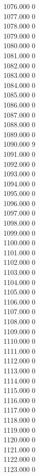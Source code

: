 { 1076.000	0 \\
 1077.000	0 \\
 1078.000	0 \\
 1079.000	0 \\
 1080.000	0 \\
 1081.000	0 \\
 1082.000	0 \\
 1083.000	0 \\
 1084.000	0 \\
 1085.000	0 \\
 1086.000	0 \\
 1087.000	0 \\
 1088.000	0 \\
 1089.000	0 \\
 1090.000	9 \\
 1091.000	0 \\
 1092.000	0 \\
 1093.000	0 \\
 1094.000	0 \\
 1095.000	0 \\
 1096.000	0 \\
 1097.000	0 \\
 1098.000	0 \\
 1099.000	0 \\
 1100.000	0 \\
 1101.000	0 \\
 1102.000	0 \\
 1103.000	0 \\
 1104.000	0 \\
 1105.000	0 \\
 1106.000	0 \\
 1107.000	0 \\
 1108.000	0 \\
 1109.000	0 \\
 1110.000	0 \\
 1111.000	0 \\
 1112.000	0 \\
 1113.000	0 \\
 1114.000	0 \\
 1115.000	0 \\
 1116.000	0 \\
 1117.000	0 \\
 1118.000	0 \\
 1119.000	0 \\
 1120.000	0 \\
 1121.000	0 \\
 1122.000	0 \\
 1123.000	0 \\
}
